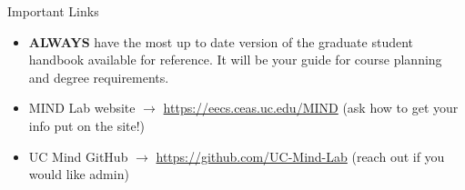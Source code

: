 \documentclass[handout]{beamer}
\begin{document}
\begin{frame}{Important Links}
\begin{itemize}
  \item \textbf{ALWAYS} have the most up to date version of the graduate student handbook available for reference. It will be your guide for course planning and degree requirements.
  \item MIND Lab website $\rightarrow$  \url{https://eecs.ceas.uc.edu/MIND} (ask how to get your info put on the site!)
  \item UC Mind GitHub $\rightarrow$ \url{https://github.com/UC-Mind-Lab} (reach out if you would like admin)
\end{itemize}
\end{frame}




\end{document}
